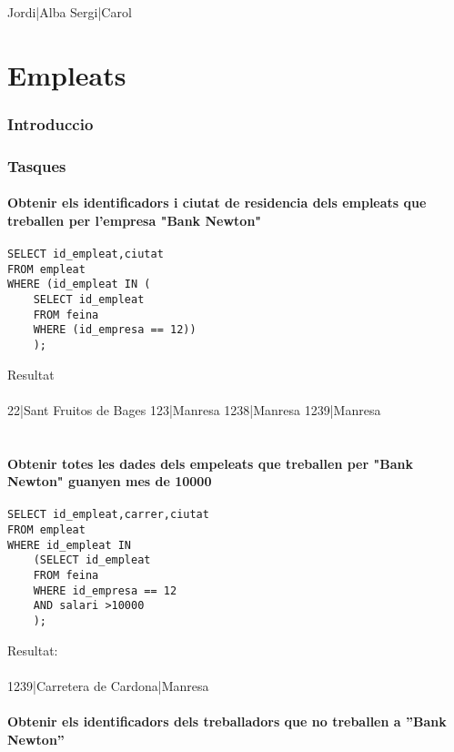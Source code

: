 \documentclass[11p]{article}
\begin{document}
Jordi|Alba
Sergi|Carol



\part{Empleats}

\section{Introduccio}

\section{Tasques}

\subsection{Obtenir els identificadors i ciutat de residencia dels empleats que treballen per l'empresa "Bank Newton"} 
\begin{lstlisting}
SELECT id_empleat,ciutat 
FROM empleat 
WHERE (id_empleat IN (
	SELECT id_empleat 
	FROM feina 
	WHERE (id_empresa == 12))
	);
\end{lstlisting}

Resultat\\\\
22|Sant Fruitos de Bages
123|Manresa
1238|Manresa
1239|Manresa\\\\

\subsection{Obtenir totes les dades dels empeleats que treballen per "Bank Newton" guanyen mes de 10000}
\begin{lstlisting}
SELECT id_empleat,carrer,ciutat 
FROM empleat 
WHERE id_empleat IN 
	(SELECT id_empleat 
	FROM feina 
	WHERE id_empresa == 12 
	AND salari >10000
	);
\end{lstlisting}

Resultat:\\\\
1239|Carretera de Cardona|Manresa

\subsection{Obtenir els identificadors dels treballadors que no treballen a ”Bank Newton”}
\end{document}
